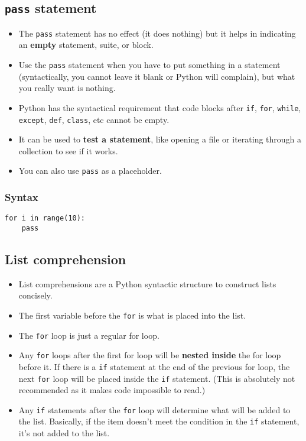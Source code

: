 \documentclass[11pt]{article}
\begin{document}
\subsection{\texttt{pass} statement}
\label{sec:orgb292b78}
\begin{itemize}
\item The \texttt{pass} statement has no effect (it does nothing) but it helps in indicating an \textbf{empty} statement, suite, or block.
\item Use the \texttt{pass} statement when you have to put something in a statement (syntactically, you cannot leave it blank or Python will complain), but what you really want is nothing.
\item Python has the syntactical requirement that code blocks after \texttt{if}, \texttt{for}, \texttt{while}, \texttt{except}, \texttt{def}, \texttt{class}, etc cannot be empty.
\item It can be used to \textbf{test a statement}, like opening a file or iterating through a collection to see if it works.
\item You can also use \texttt{pass} as a placeholder.
\end{itemize}
\subsubsection{Syntax}
\label{sec:org9db474b}
\begin{verbatim}
for i in range(10):
    pass
\end{verbatim}

 \newpage
\subsection{List comprehension}
\label{sec:orge0284a6}
\begin{itemize}
\item List comprehensions are a Python syntactic structure to construct lists concisely.
\item The first variable before the \texttt{for} is what is placed into the list.
\item The \texttt{for} loop is just a regular for loop.
\item Any \texttt{for} loops after the first for loop will be \textbf{nested inside} the for loop before it. If there is a \texttt{if} statement at the end of the previous for loop, the next \texttt{for} loop will be placed inside the \texttt{if} statement. (This is absolutely not recommended as it makes code impossible to read.)
\item Any \texttt{if} statements after the \texttt{for} loop will determine what will be added to the list. Basically, if the item doesn't meet the condition in the \texttt{if} statement, it's not added to the list.
\end{itemize}
\end{document}
